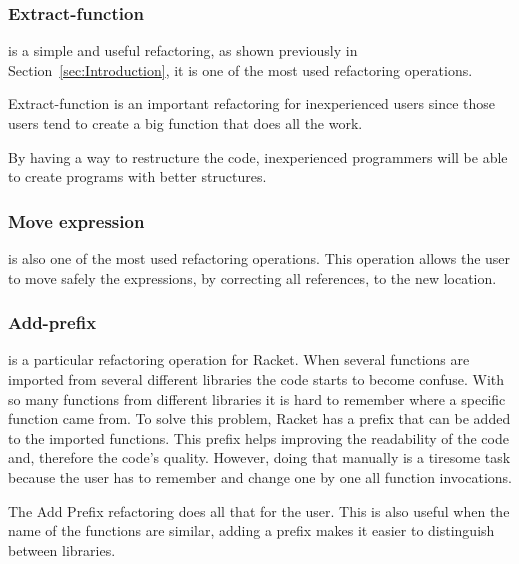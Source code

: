\subsubsection{Extract-function}

is a simple and useful refactoring, as shown previously in Section~\ref{sec:Introduction}, it is one of the most used refactoring operations.

Extract-function is an important refactoring for inexperienced users since those users tend to create a big function that does all the work.

By having a way to restructure the code, inexperienced programmers will be able to create programs with better structures.




\subsubsection{Move expression}

is also one of the most used refactoring operations.
This operation allows the user to move safely the expressions, by correcting all references, to the new location. 



\subsubsection{Add-prefix}
is a particular refactoring operation for Racket.
When several functions are imported from several different libraries the code starts to become confuse.
With so many functions from different libraries it is hard to remember where a specific function came from.
To solve this problem, Racket has a prefix that can be added to the imported functions.
This prefix helps improving the readability of the code and, therefore the code's quality.
However, doing that manually is a tiresome task because the user has to remember and change one by one all function invocations.

The Add Prefix refactoring does all that for the user.
This is also useful when the name of the functions are similar, adding a prefix makes it easier to distinguish between libraries.






